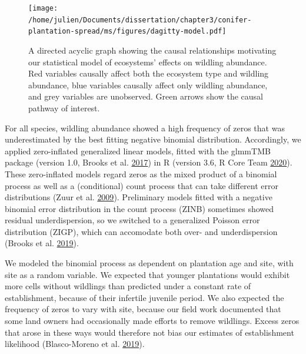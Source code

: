 \documentclass[
]{article}
\begin{document}
\begin{figure}
\centering
\texttt{[image: /home/julien/Documents/dissertation/chapter3/conifer-plantation-spread/ms/figures/dagitty-model.pdf]}
\caption{\label{fig:DAG}A directed acyclic graph showing the causal relationships motivating our statistical model of ecosystems' effects on wildling abundance. Red variables causally affect both the ecosystem type and wildling abundance, blue variables causally affect only wildling abundance, and grey variables are unobserved. Green arrows show the causal pathway of interest.}
\end{figure}

For all species, wildling abundance showed a high frequency of zeros that was underestimated by the best fitting negative binomial distribution.
Accordingly, we applied zero-inflated generalized linear models, fitted with the glmmTMB package (version 1.0, Brooks et al. \protect\hyperlink{ref-brooksGlmmTMBBalancesSpeed2017}{2017}) in R (version 3.6, R Core Team \protect\hyperlink{ref-rcoreteamLanguageEnvironmentStatistical2020}{2020}).
These zero-inflated models regard zeros as the mixed product of a binomial process as well as a (conditional) count process that can take different error distributions (Zuur et al. \protect\hyperlink{ref-zuurMixedEffectsModels2009}{2009}).
Preliminary models fitted with a negative binomial error distribution in the count process (ZINB) sometimes showed residual underdispersion, so we switched to a generalized Poisson error distribution (ZIGP), which can accomodate both over- and underdispersion (Brooks et al. \protect\hyperlink{ref-brooksStatisticalModelingPatterns2019}{2019}).

We modeled the binomial process as dependent on plantation age and site, with site as a random variable.
We expected that younger plantations would exhibit more cells without wildlings than predicted under a constant rate of establishment, because of their infertile juvenile period.
We also expected the frequency of zeros to vary with site, because our field work documented that some land owners had occasionally made efforts to remove wildlings.
Excess zeros that arose in these ways would therefore not bias our estimates of establishment likelihood (Blasco-Moreno et al. \protect\hyperlink{ref-blasco-morenoWhatDoesZero2019}{2019}).
\end{document}
